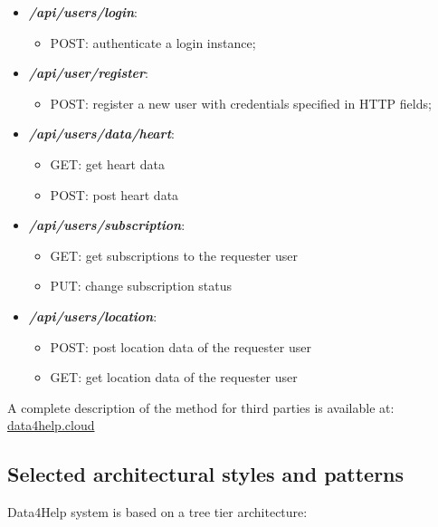 \documentclass[DD.tex]{subfiles}
\begin{document}
\begin{itemize}
	
	\item \textit{\textbf{/api/users/login}}:
		\begin{itemize}
			\item POST: authenticate a login instance;
		\end{itemize}
	\item \textit{\textbf{/api/user/register}}:
		\begin{itemize}
			\item POST: register a new user with credentials specified in HTTP fields;
		\end{itemize}	
	\item \textit{\textbf{/api/users/data/heart}}:	
		\begin{itemize}
			\item GET: get heart data
			\item POST: post heart data
		\end{itemize}	
	\item \textit{\textbf{/api/users/subscription}}:
		\begin{itemize}
			\item GET: get subscriptions to the requester user
			\item PUT: change subscription status
		\end{itemize}
	\item \textit{\textbf{/api/users/location}}:
		\begin{itemize}
			\item POST: post location data of the requester user
			\item GET: get location data of the requester user
		\end{itemize}
\end{itemize}

A complete description of the method for third parties is available at: \url{data4help.cloud}


\newpage
\subsection{Selected architectural styles and patterns}
Data4Help system is based on a tree tier architecture:
\end{document}
